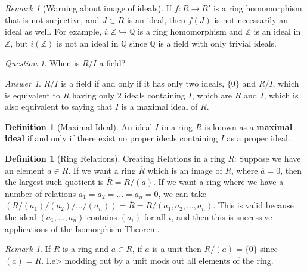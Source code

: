 \documentclass[12pt]{article}
\theoremstyle{definition}
\newtheorem{defn}[thm]{Definition}
\theoremstyle{remark}
\newtheorem{rmk}[thm]{Remark}
\newtheorem*{qst}{Question}
\newtheorem*{ans}{Answer}
\numberwithin{equation}{section}
\newcommand\Z{\mathbb Z}    %
\newcommand\Q{\mathbb Q}    %
\newcommand\B[1]{\textbf{ #1}}
\begin{document}
\vspace{15pt}

\begin{rmk}[Warning about image of ideals]
        If $f:R\rightarrow R'$ is a ring homomorphism that is not surjective, and $J \subset R$ is an ideal, then $f(J)$ is not necessarily an ideal as well. For example, $i:\Z\hookrightarrow \Q$ is a ring homomorphism and $\Z$ is an ideal in $\Z$, but $i(\Z)$ is not an ideal in $\Q$ since $\Q$ is a field with only trivial ideals.
\end{rmk}

\vspace{15pt}

\begin{qst}
        When is $R/I$ a field?
\end{qst}
\begin{ans}
        $R/I$ is a field if and only if it has only two ideals, $\{0\}$ and $R/I$, which is equivalent to $R$ having only $2$ ideals containing $I$, which are $R$ and $I$, which is also equivalent to saying that $I$ is a maximal ideal of $R$.
\end{ans}

\vspace{15pt}

\begin{defn}[Maximal Ideal]
        An ideal $I$ in a ring $R$ is known as a \B{maximal ideal} if and only if there exist no proper ideals containing $I$ as a proper ideal.
\end{defn}



\vspace{15pt}

\begin{defn}[Ring Relations]
        Creating Relations in a ring $R$: Suppose we have an element $a \in R$. If we want a ring $\overline{R}$ which is an image of $R$, where $\overline{a} = 0$, then the largest such quotient is $\overline{R} = R/(a)$. If we want a ring where we have a number of relations $a_1=a_2=...=a_n=0$, we can take $(R/(a_1)/(a_2)/.../(a_n))=\overline{R}=R/(a_1,a_2,...,a_n)$. This is valid because the ideal $(a_1,...,a_n)$ contains $(a_i)$ for all $i$, and then this is successive applications of the Isomorphism Theorem.
\end{defn}

\vspace{15pt}


\begin{rmk}
        If $R$ is a ring and $a \in R$, if $a$ is a unit then $R/(a) = \{0\}$ since $(a) = R$. I.e> modding out by a unit mods out all elements of the ring.
\end{rmk}
\end{document}
